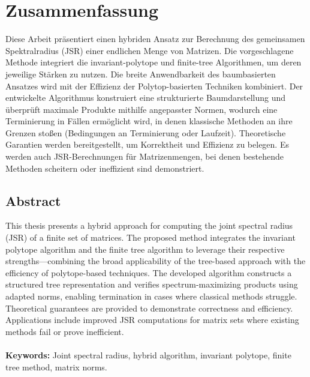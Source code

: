 \chapter*{Zusammenfassung}

Diese Arbeit präsentiert einen hybriden Ansatz zur Berechnung des gemeinsamen Spektralradius (JSR) einer endlichen Menge von Matrizen. Die vorgeschlagene Methode integriert die invariant-polytope und finite-tree Algorithmen, um deren jeweilige Stärken zu nutzen. Die breite Anwendbarkeit des baumbasierten Ansatzes wird mit der Effizienz der Polytop-basierten Techniken kombiniert. Der entwickelte Algorithmus konstruiert eine strukturierte Baumdarstellung und überprüft maximale Produkte mithilfe angepasster Normen, wodurch eine Terminierung in Fällen ermöglicht wird, in denen klassische Methoden an ihre Grenzen stoßen (Bedingungen an Terminierung oder Laufzeit). Theoretische Garantien werden bereitgestellt, um Korrektheit und Effizienz zu belegen. Es werden auch JSR-Berechnungen für Matrizenmengen, bei denen bestehende Methoden scheitern oder ineffizient sind demonstriert.

\vspace{1.3em} 					%
\section*{\huge Abstract} 	%
\vspace{1.3em} 					%

This thesis presents a hybrid approach for computing the joint spectral radius (JSR) of a finite set of matrices. The proposed method integrates the invariant polytope algorithm and the finite tree algorithm to leverage their respective strengths—combining the broad applicability of the tree-based approach with the efficiency of polytope-based techniques. The developed algorithm constructs a structured tree representation and verifies spectrum-maximizing products using adapted norms, enabling termination in cases where classical methods struggle. Theoretical guarantees are provided to demonstrate correctness and efficiency. Applications include improved JSR computations for matrix sets where existing methods fail or prove inefficient. \\ \\
\textbf{Keywords:} Joint spectral radius, hybrid algorithm, invariant polytope, finite tree method, matrix norms.

